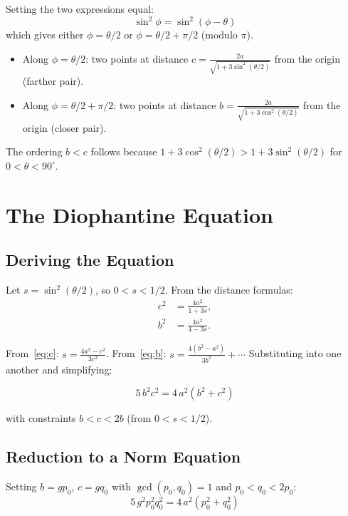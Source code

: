 \documentclass[11pt,a4paper]{article}
\begin{document}
Setting the two expressions equal:
\[
  \sin^2\phi = \sin^2(\phi - \theta)
\]
which gives either $\phi = \theta/2$ or $\phi = \theta/2 + \pi/2$ (modulo $\pi$).

\begin{itemize}
  \item Along $\phi = \theta/2$: two points at distance
    $c = \frac{2a}{\sqrt{1 + 3\sin^2(\theta/2)}}$ from the origin (farther pair).
  \item Along $\phi = \theta/2 + \pi/2$: two points at distance
    $b = \frac{2a}{\sqrt{1 + 3\cos^2(\theta/2)}}$ from the origin (closer pair).
\end{itemize}

The ordering $b < c$ follows because $1 + 3\cos^2(\theta/2) > 1 + 3\sin^2(\theta/2)$
for $0 < \theta < 90^\circ$.

\section{The Diophantine Equation}

\subsection{Deriving the Equation}

Let $s = \sin^2(\theta/2)$, so $0 < s < 1/2$. From the distance formulas:
\begin{align}
  c^2 &= \frac{4a^2}{1 + 3s}, \label{eq:c}\\
  b^2 &= \frac{4a^2}{4 - 3s}. \label{eq:b}
\end{align}

From~\eqref{eq:c}: $s = \frac{4a^2 - c^2}{3c^2}$.
From~\eqref{eq:b}: $s = \frac{4(b^2 - a^2)}{3b^2} + \cdots$
Substituting into one another and simplifying:

\begin{equation}\label{eq:main}
  \boxed{5\,b^2 c^2 = 4\,a^2(b^2 + c^2)}
\end{equation}

with constraints $b < c < 2b$ (from $0 < s < 1/2$).

\subsection{Reduction to a Norm Equation}

Setting $b = g p_0$, $c = g q_0$ with $\gcd(p_0, q_0) = 1$ and $p_0 < q_0 < 2p_0$:
\[
  5\,g^2 p_0^2 q_0^2 = 4\,a^2(p_0^2 + q_0^2)
\]
\end{document}
